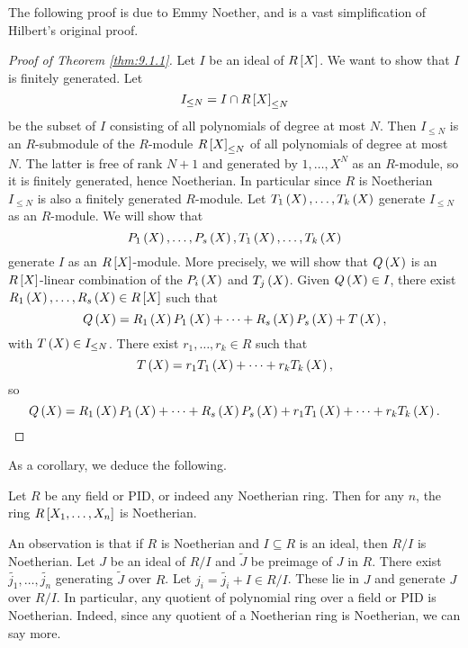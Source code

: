 \pagebreak

The following proof is due to Emmy Noether, and is a vast simplification of Hilbert's original proof.

\begin{proof}[Proof of Theorem \ref{thm:9.1.1}]
Let $ I $ be an ideal of $ R\sbr{X} $. We want to show that $ I $ is finitely generated. Let
$$ I_{\le N} = I \cap R\sbr{X}_{\le N} $$
be the subset of $ I $ consisting of all polynomials of degree at most $ N $. Then $ I_{\le N} $ is an $ R $-submodule of the $ R $-module $ R\sbr{X}_{\le N} $ of all polynomials of degree at most $ N $. The latter is free of rank $ N + 1 $ and generated by $ 1, \dots, X^N $ as an $ R $-module, so it is finitely generated, hence Noetherian. In particular since $ R $ is Noetherian $ I_{\le N} $ is also a finitely generated $ R $-module. Let $ T_1\br{X}, \dots, T_k\br{X} $ generate $ I_{\le N} $ as an $ R $-module. We will show that
$$ P_1\br{X}, \dots, P_s\br{X}, T_1\br{X}, \dots, T_k\br{X} $$
generate $ I $ as an $ R\sbr{X} $-module. More precisely, we will show that $ Q\br{X} $ is an $ R\sbr{X} $-linear combination of the $ P_i\br{X} $ and $ T_j\br{X} $. Given $ Q\br{X} \in I $, there exist $ R_1\br{X}, \dots, R_s\br{X} \in R\sbr{X} $ such that
$$ Q\br{X} = R_1\br{X}P_1\br{X} + \dots + R_s\br{X}P_s\br{X} + T\br{X}, $$
with $ T\br{X} \in I_{\le N} $. There exist $ r_1, \dots, r_k \in R $ such that
$$ T\br{X} = r_1T_1\br{X} + \dots + r_kT_k\br{X}, $$
so
$$ Q\br{X} = R_1\br{X}P_1\br{X} + \dots + R_s\br{X}P_s\br{X} + r_1T_1\br{X} + \dots + r_kT_k\br{X}. $$
\end{proof}

As a corollary, we deduce the following.

\begin{corollary}
Let $ R $ be any field or PID, or indeed any Noetherian ring. Then for any $ n $, the ring $ R\sbr{X_1, \dots, X_n} $ is Noetherian.
\end{corollary}

An observation is that if $ R $ is Noetherian and $ I \subseteq R $ is an ideal, then $ R / I $ is Noetherian. Let $ J $ be an ideal of $ R / I $ and $ \widetilde{J} $ be preimage of $ J $ in $ R $. There exist $ \widetilde{j_1}, \dots, \widetilde{j_n} $ generating $ \widetilde{J} $ over $ R $. Let $ j_i = \widetilde{j_i} + I \in R / I $. These lie in $ J $ and generate $ J $ over $ R / I $. In particular, any quotient of polynomial ring over a field or PID is Noetherian. Indeed, since any quotient of a Noetherian ring is Noetherian, we can say more.

